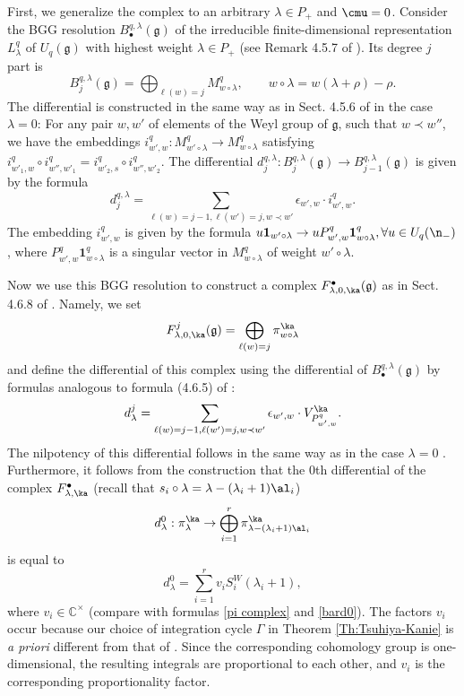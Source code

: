 \documentclass{amsart}
\newcommand{\+}{\mathop{\oplus}}
\renewcommand{\*}{{\otimes}}
\newcommand{\mf}{\mathfrak}
\newcommand{\g}{\mf{g}}
\newcommand{\C}{\mathbb{C}}
\newcommand{\lam}{\lambda}
\theoremstyle{theorem}
\theoremstyle{remark}
\numberwithin{equation}{section}
\begin{document}
First, we generalize the complex to an arbitrary $\lam \in P_+$ and
$\cmu=0$. Consider the BGG resolution $B^{q,\lam}_\bullet(\g)$ of the
irreducible finite-dimensional representation $L^q_\lam$ of $U_q(\g)$
with highest weight $\lam \in P_+$ (see Remark 4.5.7 of
\cite{FF93}). Its degree $j$ part is
$$
B^{q,\lam}_j(\g) = \bigoplus_{\ell(w)=j} M_{w \circ \lam}^q, \qquad w
\circ \lam = w(\lam+\rho)-\rho.
$$
The differential is constructed in the same way as in Sect. 4.5.6 of
\cite{FF93} in the case $\lam=0$: For any pair $w, w'$ of elements of
the Weyl group of $\g$, such that $w\prec w''$, we have the embeddings
$i_{w',w}^q: M_{w' \circ \lam}^q \to M_{w \circ \lam}^q$
satisfying $i_{w'_1,w}^q \circ i_{w'',w'_1}^q = i_{w'_2,s}^q \circ
i_{w'',w'_2}^q$. The differential $d_j^{q,\lam}: B_j^{q,\lam}(\g) \to
B_{j-1}^{q,\lam}(\g)$ is given by the formula
\begin{equation}    \label{qdiff}
d_j^{q,\lam} = \sum_{\ell(w)=j-1,\ell(w')=j,w\prec w'} \epsilon_{w',w} \cdot
i_{w',w}^q.
\end{equation}
The embedding $i_{w',w}^q$ is given by the formula $u {\mathbf
  1}_{w'\circ \lam} \to u P^q_{w',w} {\mathbf 1}_{w \circ \lam}^q,
\forall u \in U_q(\n_-)$, where $P^q_{w',w} {\mathbf 1}_{w \circ
  \lam}^q$ is a singular vector in $M^q_{w \circ \lam}$ of weight
$w'\circ \lam$.

Now we use this BGG resolution to construct a complex
$F^\bullet_{\lam,0,\ka}(\g)$ as in Sect. 4.6.8 of \cite{FF93}. Namely,
we set
$$
F^j_{\lam,0,\ka}(\g) = \bigoplus_{\ell(w)=j} \pi^\ka_{w \circ \lam}
$$
and define the differential of this complex using the differential of
$B_\bullet^{q,\lam}(\g)$ by formulas analogous to formula (4.6.5) of
\cite{FF93}:
\begin{equation}   \label{qdiff1}
d^j_\lam = \sum_{\ell(w)=j-1,\ell(w')=j,w\prec w'} \epsilon_{w',w} \cdot
V_{P_{w',w}^q}^\ka.
\end{equation}
The nilpotency of this differential follows in the same
way as in the case $\lam=0$ \cite{FF93}. Furthermore, it follows from
the construction that the $0$th differential of the complex
$F^\bullet_{\lam,\ka}$ (recall that $s_i\circ \lam =
\lam-(\lam_i+1)\al_i$)
\begin{equation}    \label{zeroth diff}
d^0_\lam: \pi^\ka_\lam \to \bigoplus_{i=1}^r
\pi^\ka_{\lam-(\lam_i+1)\al_i}
\end{equation}
is equal to
\begin{equation}    \label{sum scr}
d^0_\lam = \sum_{i=1}^{r} v_i S^W_i(\lam_i+1),
\end{equation}
where $v_i \in \C^\times$ (compare with formulas \eqref{pi complex}
and \eqref{bard0}). The factors $v_i$ occur because our choice of
integration cycle $\Gamma$ in Theorem \ref{Th:Tsuhiya-Kanie} is {\em a
  priori} different from that of \cite{FF93}. Since the corresponding
cohomology group is one-dimensional, the resulting integrals are
proportional to each other, and $v_i$ is the corresponding
proportionality factor.
\end{document}
